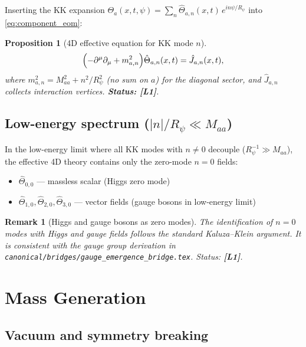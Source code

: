 \documentclass[11pt,a4paper]{article}
\newtheorem{proposition}{Proposition}
\newtheorem{remark}{Remark}
\begin{document}
Inserting the KK expansion $\Theta_a(x,t,\psi) = \sum_n \hat\Theta_{a,n}(x,t)\,
e^{in\psi/R_\psi}$ into \eqref{eq:component_eom}:

\begin{proposition}[4D effective equation for KK mode $n$]\label{prop:eff_eq}
  \begin{equation}
  \label{eq:kk_eff}
    \Bigl(-\partial^\mu\partial_\mu + m_{a,n}^2\Bigr)\hat\Theta_{a,n}(x,t)
    = \hat J_{a,n}(x,t),
  \end{equation}
  where $m_{a,n}^2 = M_{aa}^2 + n^2/R_\psi^2$ (no sum on $a$) for the
  diagonal sector, and $\hat J_{a,n}$ collects interaction vertices.
  \textbf{Status: [L1]}.
\end{proposition}

\subsection{Low-energy spectrum ($|n|/R_\psi \ll M_{aa}$)}

In the low-energy limit where all KK modes with $n \neq 0$ decouple
($R_\psi^{-1} \gg M_{aa}$), the effective 4D theory contains only the
zero-mode $n=0$ fields:
\begin{itemize}
  \item $\hat\Theta_{0,0}$ — massless scalar (Higgs zero mode)
  \item $\hat\Theta_{1,0}, \hat\Theta_{2,0}, \hat\Theta_{3,0}$ — vector fields
        (gauge bosons in low-energy limit)
\end{itemize}

\begin{remark}[Higgs and gauge bosons as zero modes]
  The identification of $n=0$ modes with Higgs and gauge fields follows
  the standard Kaluza--Klein argument.  It is consistent with the gauge
  group derivation in \texttt{canonical/bridges/gauge\_emergence\_bridge.tex}.
  Status: \textbf{[L1]}.
\end{remark}

\section{Mass Generation}
\label{sec:mass}

\subsection{Vacuum and symmetry breaking}
\end{document}

